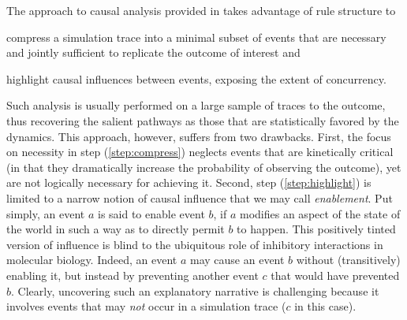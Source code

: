 The approach to causal analysis provided in
\cite{DBLP:conf/fsttcs/DanosFFHH12,DanosEtAl-CONCUR07} takes advantage
of rule structure to
\begin{inparaenum}[(i)]
\item \label{step:compress} compress a simulation trace into a minimal
  subset of events that are necessary and jointly sufficient to
  replicate the outcome of interest and
\item \label{step:highlight} highlight causal influences between
  events, exposing the extent of concurrency.
\end{inparaenum}
Such analysis is usually performed on a large sample of traces to the
outcome, thus recovering the salient pathways as those that are
statistically favored by the dynamics. This approach, however, suffers
from two drawbacks. First, the focus on necessity in step
(\ref{step:compress}) neglects events that are kinetically critical
(in that they dramatically increase the probability of observing the
outcome), yet are not logically necessary for achieving it. Second,
step (\ref{step:highlight}) is limited to a narrow notion of causal
influence that we may call \emph{enablement}. Put simply, an event $a$
is said to enable event $b$, if $a$ modifies an aspect of the state of
the world in such a way as to directly permit $b$ to happen. This
positively tinted version of influence is blind to the ubiquitous role
of inhibitory interactions in molecular biology.  Indeed, an event $a$
may cause an event $b$ without (transitively) enabling it, but instead
by preventing another event $c$ that would have prevented
$b$. Clearly, uncovering such an explanatory narrative is challenging
because it involves events that may \emph{not} occur in a simulation
trace ($c$ in this case).

